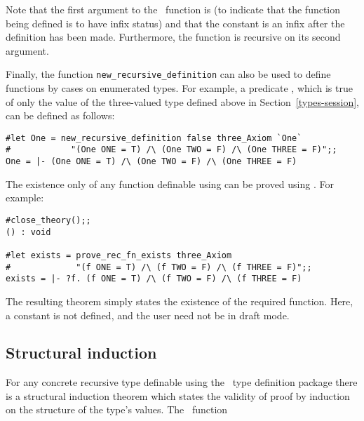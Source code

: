 {{\noindent Note that the first argument to the \ML\ function is 
(to indicate that the function being defined is to have infix status) and that
the constant \ml{<<} is an infix after the definition has been made.
Furthermore, the function \ml{<<} is recursive on its second argument.

Finally, the function {\small\verb!new_recursive_definition!} can also be used
to define functions by cases on enumerated types.  For example, a predicate
, which is true of only the value  of the three-valued type
 defined above in Section~\ref{types-session}, can be defined as
follows:

\begin{session}\begin{verbatim}
#let One = new_recursive_definition false three_Axiom `One` 
#            "(One ONE = T) /\ (One TWO = F) /\ (One THREE = F)";;
One = |- (One ONE = T) /\ (One TWO = F) /\ (One THREE = F)
\end{verbatim}\end{session}

The existence only of
any function definable using  can be proved
using .  For example:

\begin{session}\begin{verbatim}
#close_theory();;
() : void

#let exists = prove_rec_fn_exists three_Axiom 
#             "(f ONE = T) /\ (f TWO = F) /\ (f THREE = F)";;
exists = |- ?f. (f ONE = T) /\ (f TWO = F) /\ (f THREE = F)
\end{verbatim}\end{session}

\noindent The resulting theorem simply states the existence of the 
required function.  Here, a constant is not defined, and the user need
not be in draft mode.

\subsection{Structural induction}

For any concrete recursive type definable 
 using the \HOL\ type definition package there is a structural induction
theorem which states the validity of proof by induction  
on the structure of the type's values.  The \ML\ function

}}
